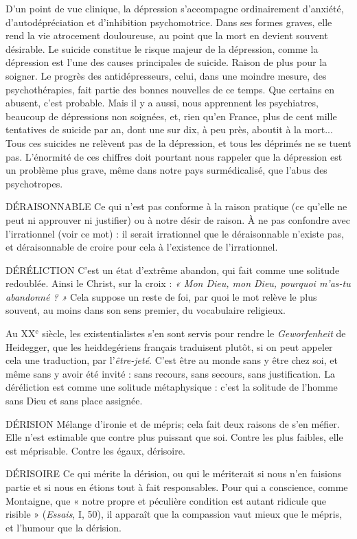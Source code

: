 D'un point de vue clinique, la dépression s'accompagne ordinairement
d’anxiété, d’autodépréciation et d’inhibition psychomotrice. Dans ses formes
graves, elle rend la vie atrocement douloureuse, au point que la mort en devient
souvent désirable. Le suicide constitue le risque majeur de la dépression,
comme la dépression est l’une des causes principales de suicide. Raison de plus
pour la soigner. Le progrès des antidépresseurs, celui, dans une moindre
mesure, des psychothérapies, fait partie des bonnes nouvelles de ce temps. Que
certains en abusent, c’est probable. Mais il y a aussi, nous apprennent les psychiatres,
beaucoup de dépressions non soignées, et, rien qu’en France, plus de
cent mille tentatives de suicide par an, dont une sur dix, à peu près, aboutit à
la mort... Tous ces suicides ne relèvent pas de la dépression, et tous les
déprimés ne se tuent pas. L’énormité de ces chiffres doit pourtant nous rappeler
que la dépression est un problème plus grave, même dans notre pays surmédicalisé,
que l’abus des psychotropes.

DÉRAISONNABLE Ce qui n’est pas conforme à la raison pratique (ce
qu’elle ne peut ni approuver ni justifier) ou à notre
désir de raison. À ne pas confondre avec l’irrationnel (voir ce mot) : il serait
irrationnel que le déraisonnable n'existe pas, et déraisonnable de croire pour
cela à l’existence de l’irrationnel.

DÉRÉLICTION C’est un état d’extrême abandon, qui fait comme une solitude
redoublée. Ainsi le Christ, sur la croix : {\it « Mon Dieu,
mon Dieu, pourquoi m'as-tu abandonné ? »} Cela suppose un reste de foi, par
quoi le mot relève le plus souvent, au moins dans son sens premier, du vocabulaire
religieux.

Au {\footnotesize XX$^\text{e}$} siècle, les existentialistes s’en sont servis pour rendre le {\it Geworfenheit}
de Heidegger, que les heiddegériens français traduisent plutôt, si on peut
appeler cela une traduction, par l’{\it être-jeté}. C’est être au monde sans y être chez
soi, et même sans y avoir été invité : sans recours, sans secours, sans justification.
La déréliction est comme une solitude métaphysique : c’est la solitude de
l’homme sans Dieu et sans place assignée.

DÉRISION Mélange d’ironie et de mépris; cela fait deux raisons de s’en
méfier. Elle n’est estimable que contre plus puissant que soi.
Contre les plus faibles, elle est méprisable. Contre les égaux, dérisoire.

DÉRISOIRE Ce qui mérite la dérision, ou qui le mériterait si nous n’en faisions
partie et si nous en étions tout à fait responsables. Pour
qui a conscience, comme Montaigne, que « notre propre et péculière condition
est autant ridicule que risible » ({\it Essais}, I, 50), il apparaît que la compassion vaut
mieux que le mépris, et l’humour que la dérision.

